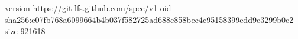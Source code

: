 version https://git-lfs.github.com/spec/v1
oid sha256:e07fb768a6099664b4b037f582725ad688c858bee4c95158399edd9c3299b0c2
size 921618
